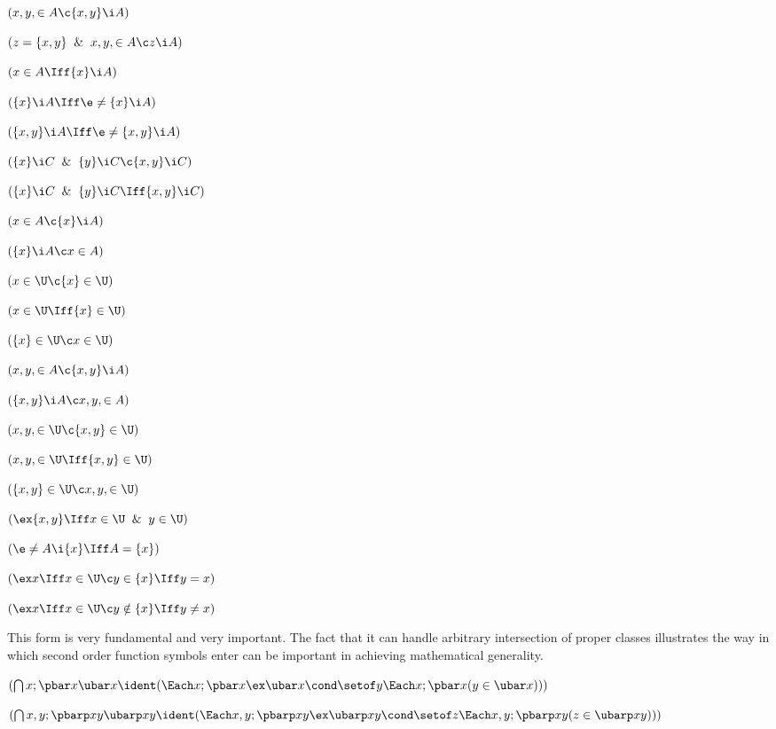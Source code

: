  $(x,y,\in A\c \{x,y\}\i A)$

 $(z = \{x,y\} \And x,y,\in A\c z \i A)$

 $(x \in A \Iff \{x\} \i A)$

 $(\{x\}\i A \Iff \e\ne\{x\}\i A)$

 $(\{x,y\}\i A\Iff \e\ne\{x,y\}\i A)$

 $(\{x\} \i C \And \{y\} \i C \c \{x,y\}\i C)$

 $(\{x\} \i C \And \{y\} \i C \Iff \{x,y\}\i C)$

 $(x \in A \c \{x\} \i A)$

 $(\{x\} \i A \c x \in A)$

 $(x \in \U \c \{x\} \in \U)$

 $(x \in \U \Iff \{x\} \in \U)$

 $(\{x\}\in \U \c x \in \U)$

 $(x,y, \in A \c \{x,y\} \i A)$

 $(\{x,y\} \i A \c x,y, \in A)$

 $(x,y, \in \U \c \{x,y\} \in \U)$

 $(x,y, \in \U \Iff \{x,y\} \in \U)$

 $(\{x,y\}\in \U \c x,y, \in \U)$

 $(\ex\{x,y\} \Iff x \in \U \And y \in \U)$

 $(\e \ne A \i \{x\} \Iff A = \{x\})$

 $(\ex x \Iff x \in \U\c y \in\{x\}\Iff y=x)$

 $(\ex x \Iff x \in \U\c y \notin\{x\}\Iff y\ne x)$

\lineb


This form is very fundamental and very important.  The fact
that it can handle arbitrary intersection of proper classes illustrates
the way in which second order function symbols enter can be important
in achieving mathematical  generality.
\lineb


 $(\bigcap x; \pbar x \ubar x \ident (\Each x;\pbar x \ex \ubar x
\cond \setof y \Each x;\pbar x (y \in \ubar x)))$

 $(\bigcap x,y; \pbarp xy \ubarp xy \ident (\Each x,y;\pbarp xy \ex \ubarp xy
\cond \setof z \Each x,y;\pbarp xy (z \in \ubarp xy)))$

